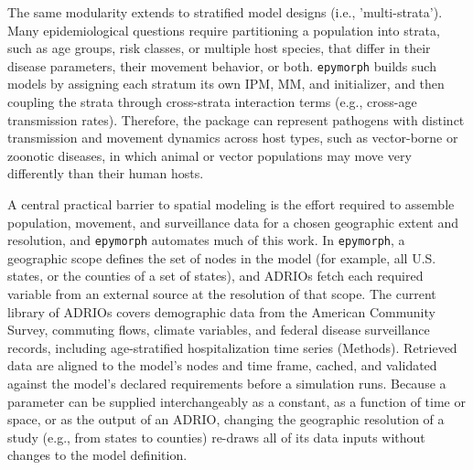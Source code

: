 The same modularity extends to stratified model designs (i.e., 'multi-strata').  
Many epidemiological questions require partitioning a population into strata, such as age groups, risk classes, or multiple host species, that differ in their disease parameters, their movement behavior, or both. 
\texttt{epymorph} builds such models by assigning each stratum its own IPM, MM, and initializer, and then coupling the strata through cross-strata interaction terms (e.g., cross-age transmission rates). 
Therefore, the package can represent pathogens with distinct transmission and movement dynamics across host types, such as vector-borne or zoonotic diseases, in which animal or vector populations may move very differently than their human hosts.

A central practical barrier to spatial modeling is the effort required to assemble population, movement, and surveillance data for a chosen geographic extent and resolution, and \texttt{epymorph} automates much of this work.
In \texttt{epymorph}, a geographic scope defines the set of nodes in the model (for example, all U.S. states, or the counties of a set of states), and ADRIOs fetch each required variable from an external source at the resolution of that scope. 
The current library of ADRIOs covers demographic data from the American Community Survey, commuting flows, climate variables, and federal disease surveillance records, including age-stratified hospitalization time series (Methods). 
Retrieved data are aligned to the model's nodes and time frame, cached, and validated against the model's declared requirements before a simulation runs.
Because a parameter can be supplied interchangeably as a constant, as a function of time or space, or as the output of an ADRIO, changing the geographic resolution of a study (e.g., from states to counties) re-draws all of its data inputs without changes to the model definition.

